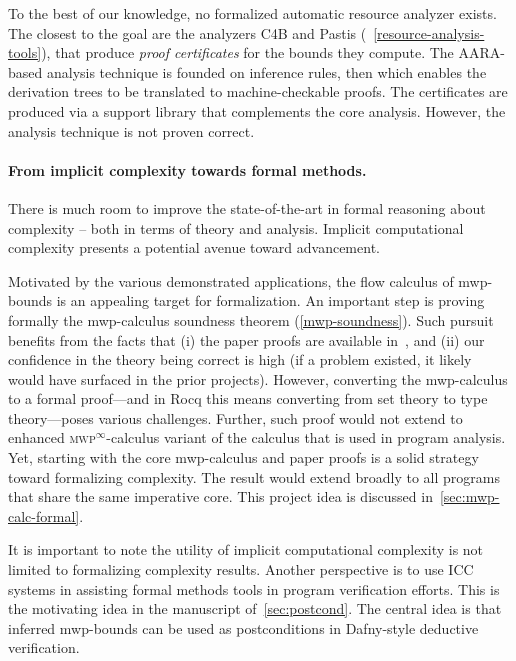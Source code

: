 To the best of our knowledge, no formalized automatic resource analyzer exists.
The closest to the goal are the analyzers C4B and Pastis (\cf~\autoref{resource-analysis-tools}),
that produce \emph{proof certificates} for the bounds they compute.
The AARA-based analysis technique is founded on inference rules, then which enables the derivation trees to be translated to machine-checkable proofs.
The certificates are produced via a support library that complements the core analysis.
However, the analysis {technique} is not proven correct.

\paragraph*{From implicit complexity towards formal methods.}
There is much room to improve the state-of-the-art in formal reasoning about complexity -- both in terms of theory and analysis.
Implicit computational complexity presents a potential avenue toward advancement.

Motivated by the various demonstrated applications, the flow calculus of mwp-bounds is an appealing target for formalization.
An important step is proving formally the mwp-calculus soundness theorem (\autoref{mwp-soundness}).
Such pursuit benefits from the facts that
(i) the paper proofs are available in~\cite{jones2009}, and
(ii) our confidence in the theory being correct is high (\ie if a problem existed, it likely would have surfaced in the prior projects).
However, converting the mwp-calculus to a formal proof---and in Rocq this means converting from set theory to type theory---poses various challenges.
Further, such proof would not extend to enhanced \textsc{mwp}$^\infty$-calculus variant of the calculus that is used in program analysis.
Yet, starting with the core mwp-calculus and paper proofs is a solid strategy toward formalizing complexity.
The result would extend broadly to all programs that share the same imperative core.
This project idea is discussed in~\autoref{sec:mwp-calc-formal}.

It is important to note the utility of implicit computational complexity is not limited to formalizing complexity results.
Another perspective is to use ICC systems in assisting formal methods tools in program verification efforts.
This is the motivating idea in the manuscript of~\autoref{sec:postcond}.
The central idea is that inferred mwp-bounds can be used as postconditions in Dafny-style deductive verification.
